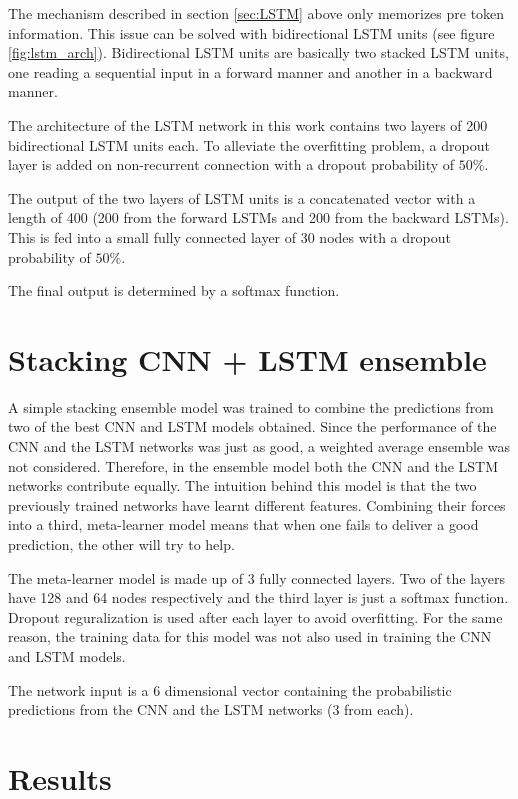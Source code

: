\documentclass[10pt,conference,compsocconf]{IEEEtran}
\begin{document}
The mechanism described in section \ref{sec:LSTM} above only memorizes pre token information. This issue can be solved with bidirectional LSTM units (see figure \ref{fig:lstm_arch}). Bidirectional LSTM units are basically two stacked LSTM units, one reading a sequential input in a forward manner and another in a backward manner. 

The architecture of the LSTM network in this work contains two layers of 200 bidirectional LSTM units each. To alleviate the overfitting problem, a dropout layer is added on non-recurrent connection with a dropout probability of $50\%$. 

The output of the two layers of LSTM units is a concatenated vector with a length of 400 (200 from the forward LSTMs and 200 from the backward LSTMs). This is fed into a small fully connected layer of 30 nodes with a dropout probability of $50\%$. 

The final output is determined by a softmax function. 

\section{Stacking CNN + LSTM ensemble} \label{sec:ensemble}

A simple stacking ensemble model was trained to combine the predictions from two of the best CNN and LSTM models obtained. Since the performance of the CNN and the LSTM networks was just as good, a weighted average ensemble was not considered. Therefore, in the ensemble model both the CNN and the LSTM networks contribute equally. The intuition behind this model is that the two previously trained networks have learnt different features. Combining their forces into a third, meta-learner model means that when one fails to deliver a good prediction, the other will try to help.

The meta-learner model is made up of 3 fully connected layers. Two of the layers have 128 and 64 nodes respectively and the third layer is just a softmax function. Dropout reguralization is used after each layer to avoid overfitting. For the same reason, the training data for this model was not also used in training the CNN and LSTM models. 

The network input is a 6 dimensional vector containing the probabilistic predictions from the CNN and the LSTM networks (3 from each). 

\section{Results} 
\label{sec:results}
\end{document}
